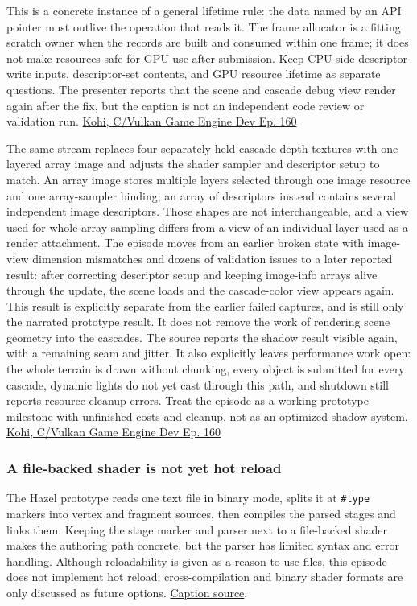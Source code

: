 This is a concrete instance of a general lifetime rule: the data named by an API pointer must outlive the operation that reads it. The frame allocator is a fitting scratch owner when the records are built and consumed within one frame; it does not make resources safe for GPU use after submission. Keep CPU-side descriptor-write inputs, descriptor-set contents, and GPU resource lifetime as separate questions. The presenter reports that the scene and cascade debug view render again after the fix, but the caption is not an independent code review or validation run. \href{https://www.youtube.com/watch?v=Zcxl3BmmxJA}{Kohi, C/Vulkan Game Engine Dev Ep. 160}

The same stream replaces four separately held cascade depth textures with one layered array image and adjusts the shader sampler and descriptor setup to match. An array image stores multiple layers selected through one image resource and one array-sampler binding; an array of descriptors instead contains several independent image descriptors. Those shapes are not interchangeable, and a view used for whole-array sampling differs from a view of an individual layer used as a render attachment. The episode moves from an earlier broken state with image-view dimension mismatches and dozens of validation issues to a later reported result: after correcting descriptor setup and keeping image-info arrays alive through the update, the scene loads and the cascade-color view appears again. This result is explicitly separate from the earlier failed captures, and is still only the narrated prototype result. It does not remove the work of rendering scene geometry into the cascades. The source reports the shadow result visible again, with a remaining seam and jitter. It also explicitly leaves performance work open: the whole terrain is drawn without chunking, every object is submitted for every cascade, dynamic lights do not yet cast through this path, and shutdown still reports resource-cleanup errors. Treat the episode as a working prototype milestone with unfinished costs and cleanup, not as an optimized shadow system. \href{https://www.youtube.com/watch?v=Zcxl3BmmxJA}{Kohi, C/Vulkan Game Engine Dev Ep. 160}

\subsubsection{A file-backed shader is not yet hot reload}\label{06-engine-ii-ch026-a-file-backed-shader-is-not-yet-hot-reload}

The Hazel prototype reads one text file in binary mode, splits it at \texttt{\#type} markers into vertex and fragment sources, then compiles the parsed stages and links them. Keeping the stage marker and parser next to a file-backed shader makes the authoring path concrete, but the parser has limited syntax and error handling. Although reloadability is given as a reason to use files, this episode does not implement hot reload; cross-compilation and binary shader formats are only discussed as future options. \href{https://www.youtube.com/watch?v=8wFEzIYRZXg}{Caption source}.


